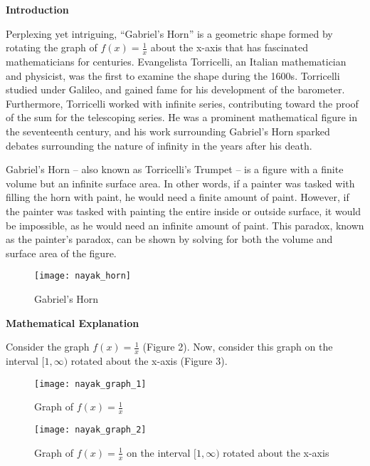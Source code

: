 \noindent
\textbf{Introduction}

	Perplexing yet intriguing, “Gabriel’s Horn” is a geometric shape formed by rotating the graph of $f(x)=\frac{1}{x}$ about the x-axis that has fascinated mathematicians for centuries. Evangelista Torricelli, an Italian mathematician and physicist, was the first to examine the shape during the 1600s. Torricelli studied under Galileo, and gained fame for his development of the barometer. Furthermore, Torricelli worked with infinite series, contributing toward the proof of the sum for the telescoping series. He was a prominent mathematical figure in the seventeenth century, and his work surrounding Gabriel’s Horn sparked debates surrounding the nature of infinity in the years after his death.

	Gabriel’s Horn – also known as Torricelli’s Trumpet – is a figure with a finite volume but an infinite surface area. In other words, if a painter was tasked with filling the horn with paint, he would need a finite amount of paint. However, if the painter was tasked with painting the entire inside or outside surface, it would be impossible, as he would need an infinite amount of paint. This paradox, known as the painter’s paradox, can be shown by solving for both the volume and surface area of the figure.
\\
\renewcommand{\thefigure}{1}
\begin{figure}[h!]
  \begin{center}
    \texttt{[image: nayak\_horn]}
    \caption{Gabriel's Horn}
    \label{fig:1} 
  \end{center}
\end{figure}

\newpage
\noindent
\textbf{Mathematical Explanation}

	Consider the graph $f(x)=\frac{1}{x}$ (Figure 2). Now, consider this graph on the interval $[1,\infty)$ rotated about the x-axis (Figure 3).
	
\renewcommand{\thefigure}{2}
\begin{figure}[h]
  \begin{center}
    \texttt{[image: nayak\_graph\_1]}
  \end{center}
  \caption{Graph of $f(x)=\frac{1}{x}$}
  \label{fig:2}
\end{figure}

\renewcommand{\thefigure}{3}
\begin{figure}[h]
  \begin{center}
    \texttt{[image: nayak\_graph\_2]}
  \end{center}
  \caption{Graph of $f(x)=\frac{1}{x}$ on the interval $[1,\infty)$ rotated about the x-axis}
  \label{fig:2}
\end{figure}

